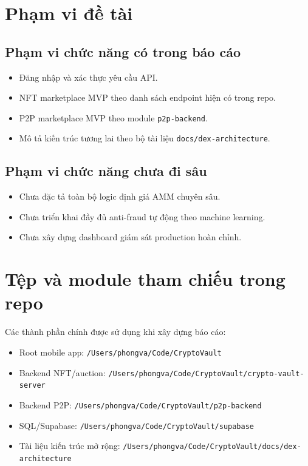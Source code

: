 \documentclass[a4paper,12pt]{report}
\begin{document}
\section{Phạm vi đề tài}
\subsection{Phạm vi chức năng có trong báo cáo}
\begin{itemize}
    \item Đăng nhập và xác thực yêu cầu API.
    \item NFT marketplace MVP theo danh sách endpoint hiện có trong repo.
    \item P2P marketplace MVP theo module \texttt{p2p-backend}.
    \item Mô tả kiến trúc tương lai theo bộ tài liệu \texttt{docs/dex-architecture}.
\end{itemize}

\subsection{Phạm vi chức năng chưa đi sâu}
\begin{itemize}
    \item Chưa đặc tả toàn bộ logic định giá AMM chuyên sâu.
    \item Chưa triển khai đầy đủ anti-fraud tự động theo machine learning.
    \item Chưa xây dựng dashboard giám sát production hoàn chỉnh.
\end{itemize}

\section{Tệp và module tham chiếu trong repo}
Các thành phần chính được sử dụng khi xây dựng báo cáo:
\begin{itemize}
    \item Root mobile app: \texttt{/Users/phongva/Code/CryptoVault}
    \item Backend NFT/auction: \texttt{/Users/phongva/Code/CryptoVault/crypto-vault-server}
    \item Backend P2P: \texttt{/Users/phongva/Code/CryptoVault/p2p-backend}
    \item SQL/Supabase: \texttt{/Users/phongva/Code/CryptoVault/supabase}
    \item Tài liệu kiến trúc mở rộng: \texttt{/Users/phongva/Code/CryptoVault/docs/dex-architecture}
\end{itemize}
\end{document}
